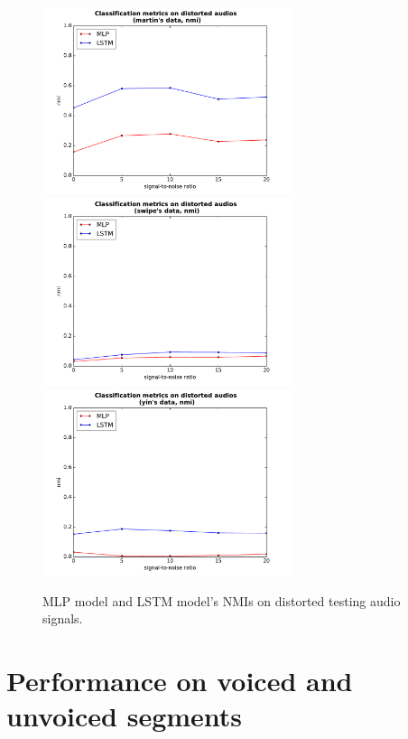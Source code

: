 \documentclass[11pt,a4paper]{report}
\begin{document}
\begin{figure}[htbp]
  \centering
  \includegraphics[width=0.65\textwidth]{classification_metrics_whole_martin_nmi.pdf}
  \includegraphics[width=0.65\textwidth]{classification_metrics_whole_swipe_nmi.pdf}
  \includegraphics[width=0.65\textwidth]{classification_metrics_whole_yin_nmi.pdf}
  \caption{MLP model and LSTM model's NMIs on distorted testing audio signals.}
  \label{fig:distorted-testing-data-nmi-whole}
\end{figure}

\section{Performance on voiced and unvoiced segments}
\end{document}
